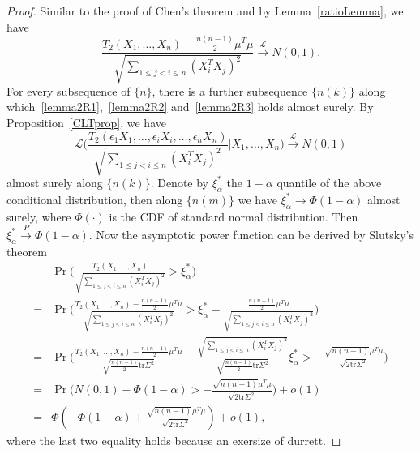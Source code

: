 \documentclass[review]{elsarticle}
\theoremstyle{plain}
\theoremstyle{definition}
\theoremstyle{remark}
\begin{document}
\begin{proof}
    Similar to the proof of Chen's theorem and by Lemma~\ref{ratioLemma}, we have
    \begin{equation}
        \frac{T_2(X_1,\ldots,X_n)-\frac{n(n-1)}{2}\mu^T\mu}{\sqrt{\sum_{1\leq j< i\leq n}(X_i^T X_j)^2}}\xrightarrow{\mathcal{L}}N(0,1).
    \end{equation}
    For every subsequence of $\{n\}$, there is a further subsequence $\{n(k)\}$ along which~\eqref{lemma2R1},~\eqref{lemma2R2} and~\eqref{lemma2R3} holds almost surely.
    By Proposition~\ref{CLTprop}, we have
    \begin{equation}
        \mathcal{L}\Big(\frac{T_2(\epsilon_1 X_1,\ldots, \epsilon_i X_i,\ldots,\epsilon_n X_n)}{\sqrt{\sum_{1\leq j<i\leq n}{(X_i^T X_j)}^2}}\Big|X_1,\ldots,X_n\Big)\xrightarrow{\mathcal{L}}N(0,1)
    \end{equation}
    almost surely along $\{n(k)\}$.
    Denote by $\xi_{\alpha}^*$ the $1-\alpha$ quantile of the above conditional distribution, then along $\{n(m)\}$ we have $\xi_{\alpha}^*\to \Phi(1-\alpha)$ almost surely, where $\Phi(\cdot)$ is the CDF of standard normal distribution. Then $\xi^*_{\alpha}\xrightarrow{P}\Phi(1-\alpha)$.
    Now the asymptotic power function can be derived by Slutsky's theorem
    \begin{equation}
        \begin{aligned}
            &\Pr\Big(\frac{T_2( X_1,\ldots, X_n)}{\sqrt{\sum_{1\leq j<i\leq n}{(X_i^T X_j)}^2}}>\xi_{\alpha}^* \Big)\\
            =&
            \Pr\Big(\frac{T_2( X_1,\ldots, X_n)-\frac{n(n-1)}{2}\mu^T\mu}{\sqrt{\sum_{1\leq j<i\leq n}{(X_i^T X_j)}^2}}>\xi_{\alpha}^*-\frac{\frac{n(n-1)}{2}\mu^T\mu}{\sqrt{\sum_{1\leq j<i\leq n}{(X_i^T X_j)}^2}} \Big)\\
            =&
            \Pr\Big(\frac{T_2( X_1,\ldots, X_n)-\frac{n(n-1)}{2}\mu^T\mu}{\sqrt{\frac{n(n-1)}{2}\mathrm{tr}\Sigma^2}}-
            \frac{\sqrt{\sum_{1\leq j<i\leq n}{(X_i^T X_j)}^2}}{\sqrt{\frac{n(n-1)}{2}\mathrm{tr}\Sigma^2}}\xi_{\alpha}^*>
            -\frac{\sqrt{n(n-1)}\mu^T\mu}{\sqrt{2\mathrm{tr}\Sigma^2}} \Big)\\
            =&
            \Pr\Big(N(0,1)-\Phi(1-\alpha)>-\frac{\sqrt{n(n-1)}\mu^T\mu}{\sqrt{2\mathrm{tr}\Sigma^2}}\Big)+o(1)\\
            =&
            \Phi(-\Phi(1-\alpha)+\frac{\sqrt{n(n-1)}\mu^T\mu}{\sqrt{2\mathrm{tr}\Sigma^2}})+o(1),
        \end{aligned}
    \end{equation}
    where the last two equality holds because an exersize of durrett.



\end{proof}
\end{document}
